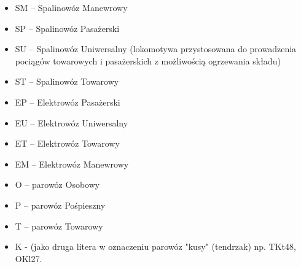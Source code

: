 \begin{itemize}
\item SM – Spalinowóz Manewrowy
\item SP – Spalinowóz Pasażerski
\item SU – Spalinowóz Uniwersalny (lokomotywa przystosowana do prowadzenia pociągów towarowych i pasażerskich z możliwością ogrzewania składu)
\item ST – Spalinowóz Towarowy
\item EP – Elektrowóz Pasażerski
\item EU – Elektrowóz Uniwersalny
\item ET – Elektrowóz Towarowy
\item EM – Elektrowóz Manewrowy
\item O – parowóz Osobowy
\item P – parowóz Pośpieszny
\item T – parowóz Towarowy
\item K - (jako druga litera w oznaczeniu parowóz "kusy" (tendrzak) np. TKt48, OKl27.
\end{itemize}

